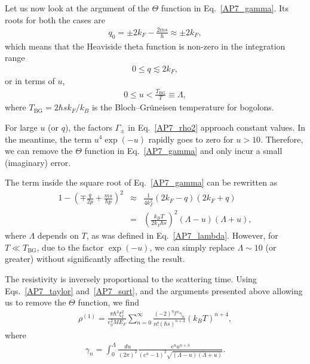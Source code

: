 Let us now look at the argument of the $\Theta$ function in Eq.~\eqref{AP7_gamma}. Its roots for both the cases are
%
\begin{eqnarray}
q_0=\pm 2k_F-\frac{2ms}{\hbar}\approx\pm2k_F,
\end{eqnarray}
%
which means that the Heaviside theta function is non-zero in the integration range
%
\begin{eqnarray}
0\leq q\lesssim 2k_F,
\end{eqnarray}
%
or in terms of $u$,
%
\begin{eqnarray}
\label{AP7_lambda}
0\leq u<\frac{T_\textrm{BG}}{T}\equiv\Lambda,
\end{eqnarray}
%
where $T_\textrm{BG}=2\hbar sk_F/k_B$ is the Bloch--Gr\"{u}neisen temperature for bogolons.

For large $u$ (or $q$), the factors $\Gamma_\pm$ in Eq.~\eqref{AP7_rho2} approach constant values.
In the meantime, the term $u^4\exp({-u})$ rapidly goes to zero for $u>10$.
%
Therefore, we can remove the $\Theta$ function in Eq.~\eqref{AP7_gamma} and only incur a small (imaginary) error.

The term inside the square root of Eq.~\eqref{AP7_gamma} can be rewritten as
%
\begin{eqnarray}
\label{AP7_sqrt}
1-\left(\mp\frac{q}{2p}+\frac{ms}{\hbar p}\right)^2&\approx &\frac{1}{4k_F^2}(2k_F-q)(2k_F+q)\nonumber\\
&=&\left(\frac{k_BT}{2k_F\hbar s}\right)^2(\Lambda-u)(\Lambda+u),
\end{eqnarray}
%
where $\Lambda$ depends on $T$, as was defined in Eq.~\eqref{AP7_lambda}. However, for $T\ll T_\textrm{BG}$, due to the factor $\exp({-u})$, we can simply replace $\Lambda\sim 10$ (or greater) without significantly affecting the result.

The resistivity is inversely proportional to the scattering time. Using Eqs.~\eqref{AP7_taylor} and~\eqref{AP7_sqrt}, and the arguments presented above allowing us to remove the $\Theta$ function, we find
%
\begin{eqnarray}
\label{AP7_28}
\rho^{(1)}=\frac{\pi\hbar^3\xi_I^2}{e_0^2ME_F}\sum_{n=0}^\infty\frac{(-2)^nl^n\gamma_n}{n!(\hbar s)^{n+4}}(k_BT)^{n+4},
\end{eqnarray}
%
where
%
\begin{eqnarray}
\label{AP7_EqMath}
\gamma_n=\int_0^\Lambda\frac{du}{(2\pi)^2}\frac{e^uu^{n+3}}{(e^u-1)^2\sqrt{(\Lambda-u)(\Lambda+u)}}.
\end{eqnarray}
%


